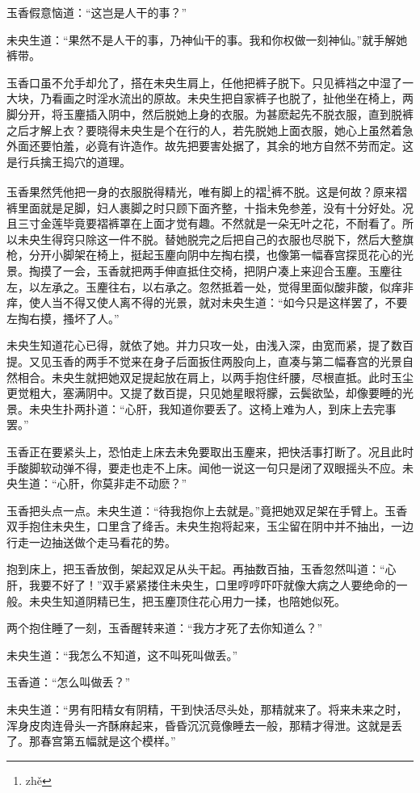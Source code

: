 \documentclass[a4paper,12pt,UTF8,twoside]{ctexbook}
\begin{document}
玉香假意恼道：“这岂是人干的事？”

未央生道：“果然不是人干的事，乃神仙干的事。我和你权做一刻神仙。”就手解她裤带。

玉香口虽不允手却允了，搭在未央生肩上，任他把裤子脱下。只见裤裆之中湿了一大块，乃看画之时淫水流出的原故。未央生把自家裤子也脱了，扯他坐在椅上，两脚分开，将玉麈插入阴中，然后脱她上身的衣服。为甚麽起先不脱衣服，直到脱裤之后才解上衣？要晓得未央生是个在行的人，若先脱她上面衣服，她心上虽然着急外面还要怕羞，必竟有许造作。故先把要害处据了，其余的地方自然不劳而定。这是行兵擒王捣穴的道理。

玉香果然凭他把一身的衣服脱得精光，唯有脚上的褶\footnote{zh\v{e}}裤不脱。这是何故？原来褶裤里面就是足脚，妇人裹脚之时只顾下面齐整，十指未免参差，没有十分好处。况且三寸金莲毕竟要褶裤罩在上面才觉有趣。不然就是一朵无叶之花，不耐看了。所以未央生得窍只除这一件不脱。替她脱完之后把自己的衣服也尽脱下，然后大整旗枪，分开小脚架在椅上，挺起玉麈向阴中左掏右摸，也像第一幅春宫探觅花心的光景。掏摸了一会，玉香就把两手伸直抵住交椅，把阴户凑上来迎合玉麈。玉麈往左，以左承之。玉麈往右，以右承之。忽然抵着一处，觉得里面似酸非酸，似痒非痒，使人当不得又使人离不得的光景，就对未央生道：“如今只是这样罢了，不要左掏右摸，搔坏了人。”

未央生知道花心已得，就依了她。并力只攻一处，由浅入深，由宽而紧，提了数百提。又见玉香的两手不觉来在身子后面扳住两股向上，直凑与第二幅春宫的光景自然相合。未央生就把她双足提起放在肩上，以两手抱住纤腰，尽根直抵。此时玉尘更觉粗大，塞满阴中。又提了数百提，只见她星眼将朦，云鬓欲坠，却像要睡的光景。未央生扑两扑道：“心肝，我知道你要丢了。这椅上难为人，到床上去完事罢。”

玉香正在要紧头上，恐怕走上床去未免要取出玉麈来，把快活事打断了。况且此时手酸脚软动弹不得，要走也走不上床。闻他一说这一句只是闭了双眼摇头不应。未央生道：“心肝，你莫非走不动麽？”

玉香把头点一点。未央生道：“待我抱你上去就是。”竟把她双足架在手臂上。玉香双手抱住未央生，口里含了绛舌。未央生抱将起来，玉尘留在阴中并不抽出，一边行走一边抽送做个走马看花的势。

抱到床上，把玉香放倒，架起双足从头干起。再抽数百抽，玉香忽然叫道：“心肝，我要不好了！”双手紧紧搂住未央生，口里哼哼吓吓就像大病之人要绝命的一般。未央生知道阴精已生，把玉麈顶住花心用力一揉，也陪她似死。

两个抱住睡了一刻，玉香醒转来道：“我方才死了去你知道么？”

未央生道：“我怎么不知道，这不叫死叫做丢。”

玉香道：“怎么叫做丢？”

未央生道：“男有阳精女有阴精，干到快活尽头处，那精就来了。将来未来之时，浑身皮肉连骨头一齐酥麻起来，昏昏沉沉竟像睡去一般，那精才得泄。这就是丢了。那春宫第五幅就是这个模样。”
\end{document}
